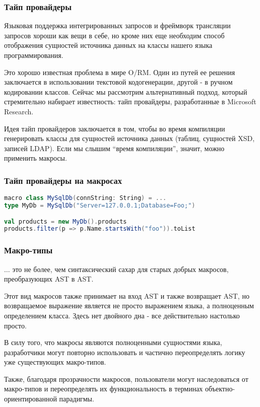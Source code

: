 \documentclass[hyperref={bookmarks=false}]{beamer}
\begin{document}
\begin{frame}[t]
\frametitle{Тайп провайдеры}

Языковая поддержка интегрированных запросов и фреймворк трансляции запросов хороши как вещи в себе, но кроме них еще необходим способ отображения сущностей источника данных на классы нашего языка программирования.

Это хорошо известная проблема в мире O/RM. Один из путей ее решения заключается в использовании текстовой кодогенерации, другой - в ручном кодировании классов. Сейчас мы рассмотрим альтернативный подход, который стремительно набирает известность: тайп провайдеры, разработанные в Microsoft Research.

Идея тайп провайдеров заключается в том, чтобы во время компиляции генерировать классы для сущностей источника данных (таблиц, сущностей XSD, записей LDAP). Если мы слышим ``время компиляции'', значит, можно применить макросы. 
\end{frame}

\begin{frame}[t, fragile]
\frametitle{Тайп провайдеры на макросах}

\begin{lstlisting}[language=scala]
macro class MySqlDb(connString: String) = ...  
type MyDb = MySqlDb("Server=127.0.0.1;Database=Foo;") 

val products = new MyDb().products
products.filter(p => p.Name.startsWith("foo")).toList 
\end{lstlisting}

\end{frame}

\begin{frame}[t]
\frametitle{Макро-типы}

$\hdots$ это не более, чем синтаксический сахар для старых добрых макросов, преобразующих AST в AST.

Этот вид макросов также принимает на вход AST и также возвращает AST, но возвращаемое выражение является не просто выражением языка, а полноценным определением класса. Здесь нет двойного дна - все действительно настолько просто.

В силу того, что макросы являются полноценными сущностями языка, разработчики могут повторно использовать и частично переопределять логику уже существующих макро-типов.

Также, благодаря прозрачности макросов, пользователи могут наследоваться от макро-типов и переопределять их функциональность в терминах объектно-ориентированной парадигмы.
\end{frame}
\end{document}
